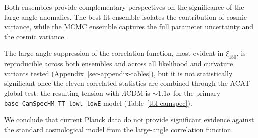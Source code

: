 \documentclass[apj,twocolumn,numberedappendix]{openjournal}
\begin{document}
Both ensembles provide complementary perspectives on the significance of
the large-angle anomalies. The best-fit ensemble isolates the
contribution of cosmic variance, while the MCMC ensemble captures the
full parameter uncertainty and the cosmic variance.

The large-angle suppression of the correlation function, most evident in
$\xi_{180}$, is reproducible across both ensembles and across all
likelihood and curvature variants tested
(Appendix~\ref{sec-appendix-tables}), but it is not
statistically significant once the eleven correlated statistics are
combined through the ACAT global test: the resulting tension with
$\Lambda$CDM is $\sim 1.1\sigma$ for the primary
\texttt{base\_CamSpecHM\_TT\_lowl\_lowE} model
(Table~\ref{tbl-camspec}).

We conclude that current Planck data do not provide significant evidence
against the standard cosmological model from the large-angle correlation
function.



\end{document}
